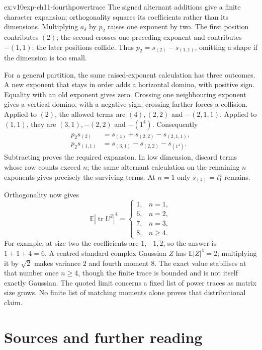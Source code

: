 \begin{solution}{ex:v10exp-ch11-fourthpowertrace}
\idea The signed alternant additions give a finite character expansion; orthogonality squares its coefficients rather than its dimensions.
\writeup Multiplying $a_\delta$ by $p_2$ raises one exponent by two. The first position contributes $(2)$; the second crosses one preceding exponent and contributes $-(1,1)$; the later positions collide. Thus $p_2=s_{(2)}-s_{(1,1)}$, omitting a shape if the dimension is too small.

For a general partition, the same raised-exponent calculation has three outcomes. A new exponent that stays in order adds a horizontal domino, with positive sign. Equality with an old exponent gives zero. Crossing one neighbouring exponent gives a vertical domino, with a negative sign; crossing farther forces a collision. Applied to $(2)$, the allowed terms are $(4),(2,2)$ and $-(2,1,1)$. Applied to $(1,1)$, they are $(3,1),-(2,2)$ and $-(1^4)$. Consequently
\[
\begin{split}
 p_2s_{(2)}&=s_{(4)}+s_{(2,2)}-s_{(2,1,1)},\\
 p_2s_{(1,1)}&=s_{(3,1)}-s_{(2,2)}-s_{(1^4)}.
\end{split}
\]
Subtracting proves the required expansion. In low dimension, discard terms whose row counts exceed $n$; the same alternant calculation on the remaining $n$ exponents gives precisely the surviving terms. At $n=1$ only $s_{(4)}=t_1^4$ remains.

Orthogonality now gives
\[
 \mathbb E|\operatorname{tr}U^2|^4=
 \begin{cases}1,&n=1,\\6,&n=2,\\7,&n=3,\\8,&n\ge4.\end{cases}
\]
For example, at size two the coefficients are $1,-1,2$, so the answer is $1+1+4=6$. A centred standard complex Gaussian $Z$ has $\mathbb E|Z|^4=2$; multiplying it by $\sqrt2$ makes variance $2$ and fourth moment $8$. The exact value stabilises at that number once $n\ge4$, though the finite trace is bounded and is not itself exactly Gaussian. The quoted limit concerns a fixed list of power traces as matrix size grows. No finite list of matching moments alone proves that distributional claim.
\end{solution}

\section*{Sources and further reading}

